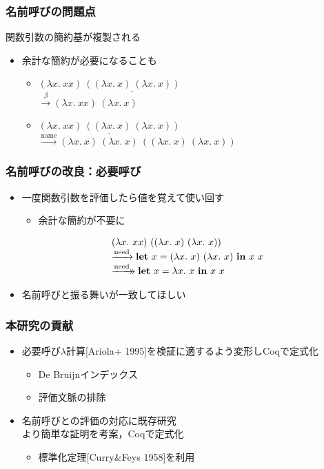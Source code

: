 \documentclass[dvipdfmx,cjk,xcolor=dvipsnames,envcountsect,notheorems,12pt]{beamer}
\theoremstyle{definition}
\newcommand{\xtwoheadrightarrow}[2][]{%
  \xrightarrow[#1]{#2}\mathrel{\mkern-14mu}\rightarrow
}
\newcommand{\LET}[3]{\mathbf{let}~#1=#2~\mathbf{in}~#3}
\newcommand{\FULLBETA}{\xrightarrow{\beta}}
\newcommand{\CALLBYNEED}{\xrightarrow{\mathrm{need}}}
\newcommand{\CALLBYNAME}{\xrightarrow{\mathrm{name}}}
\newcommand{\RTCLOSCALLBYNEED}{\xtwoheadrightarrow{\mathrm{need}}}
\begin{document}
\begin{frame}
	\frametitle{名前呼びの問題点}
	\LARGE 関数引数の簡約基が複製される
	\begin{itemize}
		\item 余計な簡約が必要になることも
		\vfill
		\begin{itemize}
			\item $(\lambda x.~xx)~\underline{((\lambda x.~x)~(\lambda x.~x))}$ \\
				$\FULLBETA (\lambda x.~xx)~(\lambda x.~x)$
			\item $\underline{(\lambda x.~xx)~((\lambda x.~x)~(\lambda x.~x))}$ \\
				$\CALLBYNAME (\lambda x.~x)~(\lambda x.~x)~((\lambda x.~x)~(\lambda x.~x))$
		\end{itemize}
	\end{itemize}
\end{frame}

\begin{frame}
	\frametitle{名前呼びの改良：必要呼び}
	\begin{itemize}
		\item 一度関数引数を評価したら値を覚えて使い回す
			\begin{itemize}
				\item 余計な簡約が不要に
			\end{itemize}
			\[\begin{array}{l}
				(\lambda x.~xx)~((\lambda x.~x)~(\lambda x.~x)) \\
				\CALLBYNEED \LET{x}{(\lambda x.~x)~(\lambda x.~x)}{x~x} \\
				\RTCLOSCALLBYNEED \LET{x}{\lambda x.~x}{x~x}
			\end{array}\]
		\item 名前呼びと振る舞いが一致してほしい
	\end{itemize}
\end{frame}

\begin{frame}
	\frametitle{本研究の貢献}
	\begin{itemize}
		\item 必要呼び$\lambda$計算[Ariola+ 1995]を検証に適するよう変形しCoqで定式化
			\begin{itemize}
				\item De Bruijnインデックス
				\item 評価文脈の排除
			\end{itemize}
		\item 名前呼びとの評価の対応に既存研究\\より簡単な証明を考案，Coqで定式化
			\begin{itemize}
				\item 標準化定理[Curry\&Feys 1958]を利用
			\end{itemize}
	\end{itemize}
\end{frame}
\end{document}
